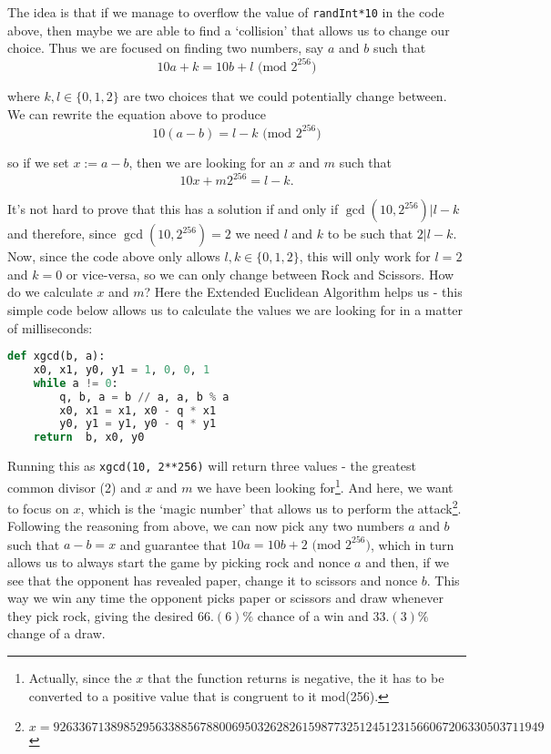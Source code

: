\documentclass{article}
\begin{document}
    \noindent The idea is that if we manage to overflow the
    value of \verb|randInt*10| in the code above, then maybe
    we are able to find a `collision' that allows us to
    change our choice. Thus we are focused on finding two
    numbers, say \(a\) and \(b\) such that 
    \[
        10a + k = 10b + l \text{ (mod 2}^{256})
    \]

    \noindent where \(k,l \in \{0,1,2\}\) are two choices
    that we could potentially change between. We can rewrite
    the equation above to produce
    \[
        10(a-b) = l - k \text{ (mod 2}^{256})
    \]

    \noindent so if we set \(x := a - b\), then we are
    looking for an \(x\) and \(m\) such that
    \[
        10x + m2^{256} = l - k.
    \]

    \noindent It's not hard to prove that this has a
    solution if and only if \(\gcd(10, 2^{256}) | l - k\)
    and therefore, since \(\gcd(10, 2^{256}) = 2\) we need
    \(l\) and \(k\) to be such that \(2 | l - k\). Now,
    since the code above only allows \(l,k \in \{0, 1,
    2\}\), this will only work for \(l = 2\) and \(k = 0\)
    or vice-versa, so we can only change between Rock and
    Scissors. How do we calculate \(x\) and \(m\)? Here the
    Extended Euclidean Algorithm helps us - this simple code
    below allows us to calculate the values we are looking
    for in a matter of milliseconds:

    \begin{lstlisting}[language=Python]
def xgcd(b, a):
    x0, x1, y0, y1 = 1, 0, 0, 1
    while a != 0:
        q, b, a = b // a, a, b % a
        x0, x1 = x1, x0 - q * x1
        y0, y1 = y1, y0 - q * y1
    return  b, x0, y0
    \end{lstlisting}

    \noindent Running this as \verb|xgcd(10, 2**256)| will
    return three values - the greatest common divisor (2)
    and \(x\) and \(m\) we have been looking
    for\footnote{Actually, since the \(x\) that the function
    returns is negative, the it has to be converted to a
    positive value that is congruent to it mod(256).}. And
    here, we want to focus on \(x\), which is the `magic
    number' that allows us to perform the
    attack\footnote{\(x=92633671389852956338856788006950326282615987732512451231566067206330503711949\)}.
    Following the reasoning from above, we can now pick any
    two numbers \(a\) and \(b\) such that \(a - b = x\) and
    guarantee that \(10a = 10b + 2 \text{ (mod 2}^{256})\),
    which in turn allows us to always start the game by
    picking rock and nonce \(a\) and then, if we see that
    the opponent has revealed paper, change it to scissors
    and nonce \(b\). This way we win any time the opponent
    picks paper or scissors and draw whenever they pick
    rock, giving the desired \(66.(6)\%\) chance of a win
    and \(33.(3)\%\) change of a draw.
    \newline
\end{document}
